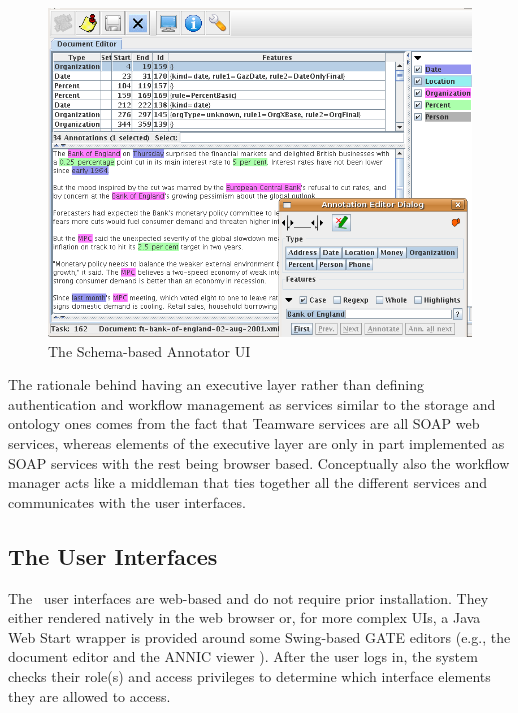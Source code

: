 \begin{figure}[t!]
\begin{center}
\includegraphics[scale=0.5]{teamware-ann-gui-annon.png}
\caption{The Schema-based Annotator UI} \label{fig:annGUI}
\end{center}
\end{figure}

The rationale behind having an executive layer rather than defining authentication 
and workflow management as services similar to the storage and ontology ones 
comes from the fact that Teamware services are all SOAP web services, whereas
elements of the executive layer are only in part implemented as SOAP services with the
rest being browser based. Conceptually also the workflow manager acts like a middleman that ties 
together all the different services and communicates with the user interfaces.

\subsection{The User Interfaces}

The \teamware\ user interfaces are web-based and do not require prior installation. They either rendered natively in the web browser or, for more complex UIs, a Java Web Start wrapper is provided around some Swing-based GATE editors (e.g., the document editor and the ANNIC viewer \cite{Aswani05}). After the user logs in, the system checks their role(s) and access privileges to determine which interface elements they are allowed to access. 

